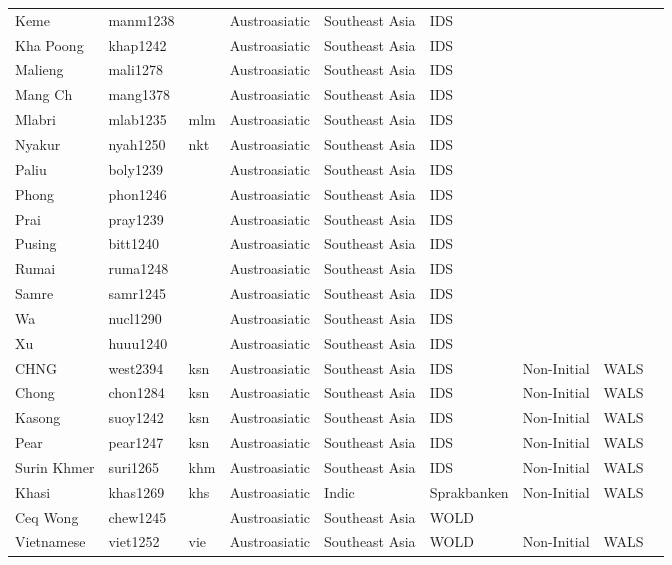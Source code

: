 \begin{longtable}{lllllllll}
  Keme  & manm1238 &  & Austroasiatic & Southeast Asia & IDS &  &  &  \\ 
  Kha Poong & khap1242 &  & Austroasiatic & Southeast Asia & IDS &  &  &  \\ 
  Malieng & mali1278 &  & Austroasiatic & Southeast Asia & IDS &  &  &  \\ 
  Mang Ch & mang1378 &  & Austroasiatic & Southeast Asia & IDS &  &  &  \\ 
  Mlabri & mlab1235 & mlm & Austroasiatic & Southeast Asia & IDS &  &  &  \\ 
  Nyakur & nyah1250 & nkt & Austroasiatic & Southeast Asia & IDS &  &  &  \\ 
  Paliu & boly1239 &  & Austroasiatic & Southeast Asia & IDS &  &  &  \\ 
  Phong & phon1246 &  & Austroasiatic & Southeast Asia & IDS &  &  &  \\ 
  Prai & pray1239 &  & Austroasiatic & Southeast Asia & IDS &  &  &  \\ 
  Pusing & bitt1240 &  & Austroasiatic & Southeast Asia & IDS &  &  &  \\ 
  Rumai & ruma1248 &  & Austroasiatic & Southeast Asia & IDS &  &  &  \\ 
  Samre & samr1245 &  & Austroasiatic & Southeast Asia & IDS &  &  &  \\ 
  Wa & nucl1290 &  & Austroasiatic & Southeast Asia & IDS &  &  &  \\ 
  Xu & huuu1240 &  & Austroasiatic & Southeast Asia & IDS &  &  &  \\ 
  CHNG  & west2394 & ksn & Austroasiatic & Southeast Asia & IDS & Non-Initial & WALS &  \\ 
  Chong & chon1284 & ksn & Austroasiatic & Southeast Asia & IDS & Non-Initial & WALS &  \\ 
  Kasong & suoy1242 & ksn & Austroasiatic & Southeast Asia & IDS & Non-Initial & WALS &  \\ 
  Pear & pear1247 & ksn & Austroasiatic & Southeast Asia & IDS & Non-Initial & WALS &  \\ 
  Surin Khmer & suri1265 & khm & Austroasiatic & Southeast Asia & IDS & Non-Initial & WALS &  \\ 
  Khasi & khas1269 & khs & Austroasiatic & Indic & Sprakbanken & Non-Initial & WALS &  \\ 
  Ceq Wong & chew1245 &  & Austroasiatic & Southeast Asia & WOLD &  &  &  \\ 
  Vietnamese & viet1252 & vie & Austroasiatic & Southeast Asia & WOLD & Non-Initial & WALS &  \\ 

\end{longtable}
